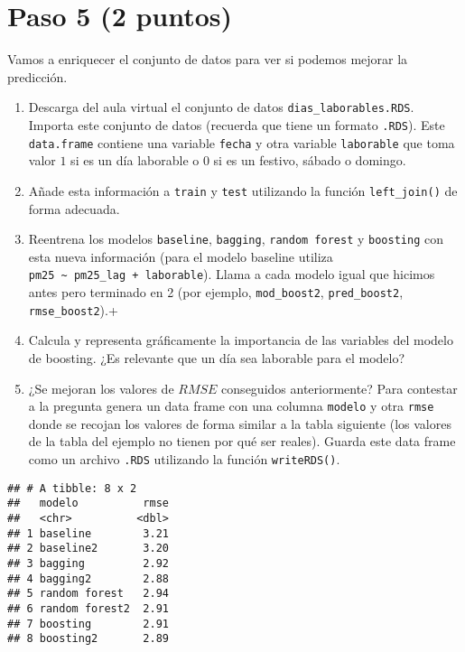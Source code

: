 \documentclass[]{article}
\providecommand{\tightlist}{%
  \setlength{\itemsep}{0pt}\setlength{\parskip}{0pt}}
\begin{document}
\hypertarget{paso-5-2-puntos}{%
\section{Paso 5 (2 puntos)}\label{paso-5-2-puntos}}

Vamos a enriquecer el conjunto de datos para ver si podemos mejorar la
predicción.

\begin{enumerate}
\def\labelenumi{\arabic{enumi}.}
\tightlist
\item
  Descarga del aula virtual el conjunto de datos
  \texttt{dias\_laborables.RDS}. Importa este conjunto de datos
  (recuerda que tiene un formato \texttt{.RDS}). Este
  \texttt{data.frame} contiene una variable \texttt{fecha} y otra
  variable \texttt{laborable} que toma valor \(1\) si es un día
  laborable o \(0\) si es un festivo, sábado o domingo.
\item
  Añade esta información a \texttt{train} y \texttt{test} utilizando la
  función \texttt{left\_join()} de forma adecuada.
\item
  Reentrena los modelos \texttt{baseline}, \texttt{bagging},
  \texttt{random\ forest} y \texttt{boosting} con esta nueva información
  (para el modelo baseline utiliza
  \texttt{pm25\ \textasciitilde{}\ pm25\_lag\ +\ laborable}). Llama a
  cada modelo igual que hicimos antes pero terminado en 2 (por ejemplo,
  \texttt{mod\_boost2}, \texttt{pred\_boost2}, \texttt{rmse\_boost2}).+
\item
  Calcula y representa gráficamente la importancia de las variables del
  modelo de boosting. ¿Es relevante que un día sea laborable para el
  modelo?
\item
  ¿Se mejoran los valores de \(RMSE\) conseguidos anteriormente? Para
  contestar a la pregunta genera un data frame con una columna
  \texttt{modelo} y otra \texttt{rmse} donde se recojan los valores de
  forma similar a la tabla siguiente (los valores de la tabla del
  ejemplo no tienen por qué ser reales). Guarda este data frame como un
  archivo \texttt{.RDS} utilizando la función \texttt{writeRDS()}.
\end{enumerate}

\begin{verbatim}
## # A tibble: 8 x 2
##   modelo          rmse
##   <chr>          <dbl>
## 1 baseline        3.21
## 2 baseline2       3.20
## 3 bagging         2.92
## 4 bagging2        2.88
## 5 random forest   2.94
## 6 random forest2  2.91
## 7 boosting        2.91
## 8 boosting2       2.89
\end{verbatim}
\end{document}
